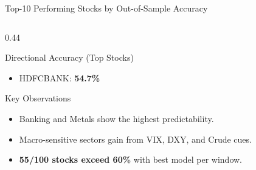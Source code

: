 \documentclass[aspectratio=43,11pt]{beamer}
\begin{document}
\begin{frame}[shrink=3]{Top-10 Performing Stocks by Out-of-Sample Accuracy}
\begin{columns}[T]
\begin{column}{0.44\textwidth}
\begin{block}{Directional Accuracy (Top Stocks)}
\begin{itemize}
                    \item HDFCBANK: \textbf{54.7\%}
                \end{itemize}
            \end{block}
            \begin{alertblock}{Key Observations}
                \footnotesize
                \begin{itemize}\setlength{\itemsep}{1pt}
                    \item Banking and Metals show the highest predictability.
                    \item Macro-sensitive sectors gain from VIX, DXY, and Crude cues.
                    \item \textbf{55/100 stocks exceed 60\%} with best model per window.
                \end{itemize}
            \end{alertblock}
        \end{column}
    \end{columns}
\end{frame}
\end{document}
